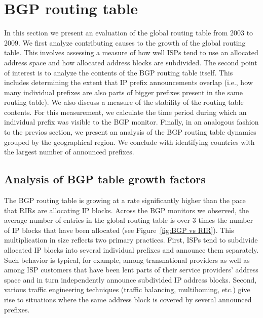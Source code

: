 \section{BGP routing table}
\label{sec:bgp}

In this section we present an evaluation of the global routing table from 2003
to 2009. We first analyze contributing causes to the growth of the global
routing table. This involves assessing a measure of how well ISPs tend to use
an allocated address space and how allocated address blocks are subdivided.
The second point of interest is to analyze the contents of the BGP routing
table itself. This includes determining the extent that IP prefix
announcements overlap (i.e., how many individual prefixes are also parts of
bigger prefixes present in the same routing table). We also discuss a measure
of the stability of the routing table contents. For this measurement, we
calculate the time period during which an individual prefix was visible to the
BGP monitor. Finally, in an analogous fashion to the previos section, we
present an analysis of the BGP routing table dynamics grouped by the
geographical region. We conclude with identifying countries with the largest
number of announced prefixes.

\subsection{Analysis of BGP table growth factors}

The BGP routing table is growing at a rate significantly higher than the pace
that RIRs are allocating IP blocks. Across the BGP monitors we observed, the
average number of entries in the global routing table is over 3 times the
number of IP blocks that have been allocated (see Figure~\ref{fig:BGP vs RIR}).
This multiplication in size reflects two primary practices. First, ISPs tend to
subdivide allocated IP blocks into several individual prefixes and announce
them separately. Such behavior is typical, for example, among transnational
providers as well as among ISP customers that have been lent parts of their
service providers' address space and in turn independently announce subdivided
IP address blocks. Second, various traffic engineering techniques (traffic
balancing, multihoming, etc.) give rise to situations where the same address
block is covered by several announced prefixes.

